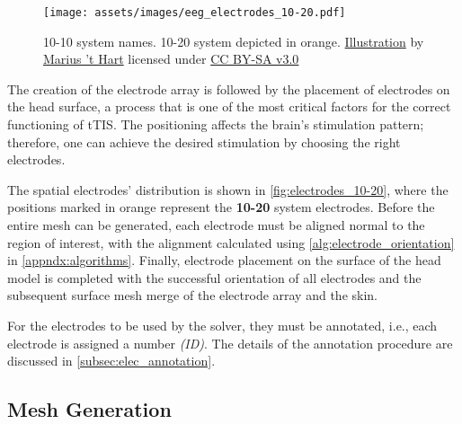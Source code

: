 \begin{wrapfigure}{l}{0.48\textwidth}
    \centering
    \vspace{-15pt}
    \texttt{[image: assets/images/eeg\_electrodes\_10-20.pdf]}
    \caption[10-10 system names. The orange electrodes are used in the 10-20 system.]{10-10 system names. 10-20 system depicted in orange. \href{http://www.mariusthart.net/downloads/eeg_electrodes_10-20.svg}{Illustration} by \href{http://www.beteredingen.nl}{Marius 't Hart} licensed under \href{http://creativecommons.org/licenses/by-sa/3.0/nl/deed.en_GB}{CC BY-SA v3.0}}
    \label{fig:electrodes_10-20}
\end{wrapfigure}

The creation of the electrode array is followed by the placement of electrodes on the head surface, a process that is one of the most critical factors for the correct functioning of \gls{tTIS}. The positioning affects the brain's stimulation pattern; therefore, one can achieve the desired stimulation by choosing the right electrodes.

The spatial electrodes' distribution is shown in \autoref{fig:electrodes_10-20}, where the positions marked in orange represent the \textbf{10-20} system electrodes. Before the entire mesh can be generated, each electrode must be aligned normal to the region of interest, with the alignment calculated using \autoref{alg:electrode_orientation} in \autoref{appndx:algorithms}. Finally, electrode placement on the surface of the head model is completed with the successful orientation of all electrodes and the subsequent surface mesh merge of the electrode array and the skin.

For the electrodes to be used by the solver, they must be annotated, i.e., each electrode is assigned a number \textit{(ID)}. The details of the annotation procedure are discussed in \ref{subsec:elec_annotation}.

\subsection{Mesh Generation}
\label{subsec:mesh_generation}

